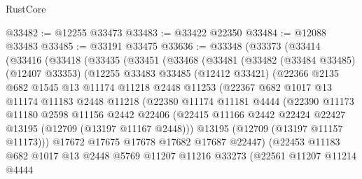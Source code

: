 \begin{lexlean}{RustCore}
\begin{coremodule}
@33482 := @12255 @33473
@33483 := @33422 @22350
@33484 := @12088 @33483
@33485 := @33191 @33475
@33636 := @33348
    (@33373
      (@33414
        (@33416
          (@33418
            (@33435
              (@33451
                (@33468
                  (@33481
                    (@33482
                      (@33484 @33485)
                      (@12407 @33353)
                      (@12255
                        @33483
                        @33485
                        (@12412 @33421)
                        (@22366
                          @2135
                          @682
                          @1545
                          @13
                          @11174
                          @11218
                          @2448
                          @11253
                          (@22367
                            @682
                            @1017
                            @13
                            @11174
                            @11183
                            @2448
                            @11218
                            (@22380
                              @11174
                              @11181
                              @4444
                              (@22390
                                @11173
                                @11180
                                @2598
                                @11156
                                @2442
                                @22406
                                (@22415
                                  @11166
                                  @2442
                                  @22424
                                  @22427
                                  @13195
                                  (@12709 (@13197 @11167 @2448)))
                                @13195
                                (@12709 (@13197 @11157 @11173)))
                              @17672
                              @17675
                              @17678
                              @17682
                              @17687
                              @22447)
                            (@22453
                              @11183
                              @682
                              @1017
                              @13
                              @2448
                              @5769
                              @11207
                              @11216
                              @33273
                              (@22561
                                @11207
                                @11214
                                @4444

\end{coremodule}
\end{lexlean}

